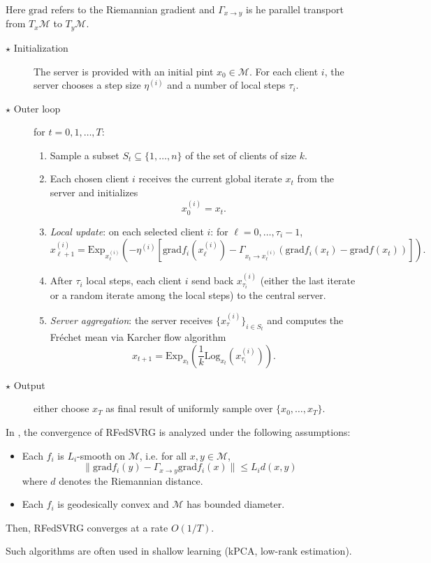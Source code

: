 \documentclass[10pt,a4paper]{book}
\theoremstyle{definition}
\theoremstyle{plain}
\theoremstyle{remark}
\newcommand{\grad}{\textrm{grad}}
\newcommand \M {\mathcal{M}}
\begin{document}
Here $\grad$ refers to the Riemannian gradient and $\Gamma_{x\to y}$ is he parallel transport from $T_x\M$ to $T_y\M$.
\begin{description}
\item[$\star$ Initialization] The server is provided with an initial pint $x_0 \in \M$.
For each client $i$, the server chooses a step size $\eta^{(i)}$ and a number of local steps $\tau_i$.
\item[$\star$ Outer loop] for $t=0,1,\dots, T$:
\begin{enumerate}
\item Sample a subset $S_t \subseteq \{1,\dots,n\}$ of the set of clients of size $k$.
\item Each chosen client $i$ receives the current global iterate $x_t$ from the server and initializes
$$x_0^{(i)}=x_t.$$
\item \textit{Local update}: on each selected client $i$: for $\ell=0,\dots, \tau_i-1$,
$$x_{\ell+1}^{(i)}=\text{Exp}_{x_{\ell}^{(i)}}\left(-\eta^{(i)}\left [\grad f_i(x_{\ell}^{(i)}) -\Gamma_{x_t \to x_{\ell}^{(i)}}\left(\grad f_i(x_t)-\grad f(x_t) \right)\right ]\right).$$
\item After $\tau_i$ local steps, each client $i$ send back $x_{\tau_i}^{(i)}$ (either the last iterate or a random iterate among the local steps) to the central server.
\item \textit{Server aggregation}: the server receives $\{x_{\tau}^{(i)}\}_{i\in S_t}$ and computes the Fréchet mean via Karcher flow algorithm
$$x_{t+1}=\text{Exp}_{x_t}\left(\frac{1}{k}\text{Log}_{x_t}(x_{\tau_i}^{(i)})\right).$$
\end{enumerate}
\item[$\star$ Output] either choose $x_T$ as final result of uniformly sample over $\{x_0,\dots, x_T\}$.
\end{description}

In \cite{li2022federated}, the convergence of RFedSVRG is analyzed under the following assumptions:
 \begin{itemize}
 \item Each $f_i$ is $L_i$-smooth on $\M$, i.e. for all $x,y \in \M$,
 $$\|\grad f_i(y)- \Gamma_{x\to y}\grad f_i(x)\|\leq L_i d(x,y)$$
 where $d$ denotes the Riemannian distance.
 \item Each $f_i$ is geodesically convex and $\M$ has bounded diameter.
 \end{itemize}
 Then, RFedSVRG converges at a rate $O(1/T)$.


Such algorithms are often used in shallow learning (kPCA, low-rank estimation). 
\end{document}
